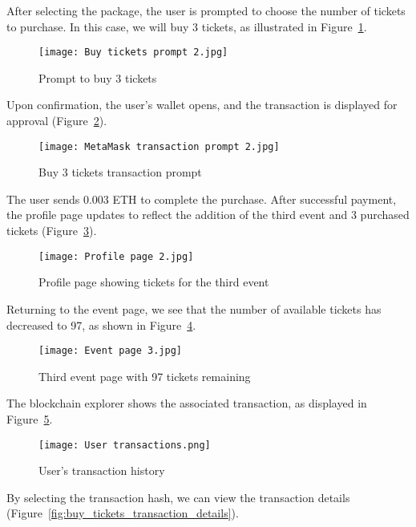 After selecting the package, the user is prompted to choose the number of
tickets to purchase. In this case, we will buy 3 tickets, as illustrated in
Figure~\ref{fig:buy_tickets_prompt_2}.

\begin{figure}[H]
    \texttt{[image: Buy tickets prompt 2.jpg]}
    \centering
    \caption{Prompt to buy 3 tickets}\label{fig:buy_tickets_prompt_2}
\end{figure}

Upon confirmation, the user's wallet opens, and the transaction is displayed
for approval (Figure~\ref{fig:buy_tickets_transaction}).

\begin{figure}[H]
    \texttt{[image: MetaMask transaction prompt 2.jpg]}
    \centering
    \caption{Buy 3 tickets transaction prompt}\label{fig:buy_tickets_transaction}
\end{figure}

The user sends 0.003 ETH to complete the purchase. After successful payment,
the profile page updates to reflect the addition of the third event and 3
purchased tickets (Figure~\ref{fig:profile_page_2}).

\begin{figure}[H]
    \texttt{[image: Profile page 2.jpg]}
    \centering
    \caption{Profile page showing tickets for the third event}\label{fig:profile_page_2}
\end{figure}

Returning to the event page, we see that the number of available tickets has
decreased to 97, as shown in Figure~\ref{fig:buy_tickets_event_2}.

\begin{figure}[H]
    \texttt{[image: Event page 3.jpg]}
    \centering
    \caption{Third event page with 97 tickets remaining}\label{fig:buy_tickets_event_2}
\end{figure}

The blockchain explorer shows the associated transaction, as displayed in
Figure~\ref{fig:user_transactions}.

\begin{figure}[H]
    \texttt{[image: User transactions.png]}
    \centering
    \caption{User's transaction history}\label{fig:user_transactions}
\end{figure}

By selecting the transaction hash, we can view the transaction details
(Figure~\ref{fig:buy_tickets_transaction_details}).

